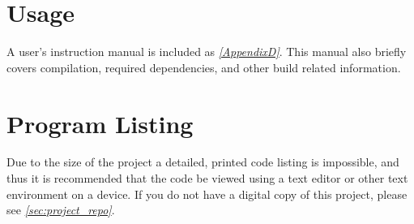 \section{Usage}

  A user's instruction manual is included as \emph{\textsection \ref{AppendixD}}. This manual also briefly covers compilation, required dependencies, and other build related information.

\section{Program Listing}

  Due to the size of the project a detailed, printed code listing is impossible, and thus it is recommended that the code be viewed using a text editor or other text environment on a device. If you do not have a digital copy of this project, please see \emph{\textsection \ref{sec:project_repo}}.